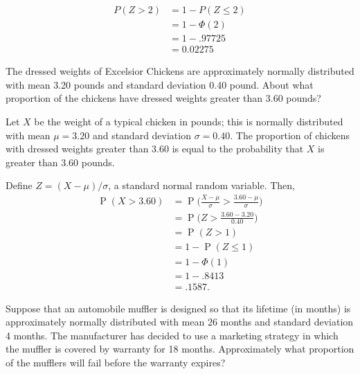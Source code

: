 \documentclass[answers,11pt]{exam}
\DeclareMathOperator*{\Prob}{P}
\renewcommand{\Pr}{\Prob}
\begin{document}
\begin{questions}
\begin{solution}
\begin{align*}
  P(Z > 2) &= 1 - P(Z \leq 2) \\
  	      &= 1 - \Phi(2) \\
	      &= 1 - .97725 \\
	      &= 0.02275
\end{align*}
\end{solution}



\newpage



\question The dressed weights of Excelsior Chickens are approximately normally
distributed with mean 3.20 pounds and standard deviation 0.40 pound.  About
what proportion of the chickens have dressed weights greater than 3.60 pounds?

\begin{solution}
Let $X$ be the weight of a typical chicken in pounds; this is normally distributed with
mean $\mu = 3.20$ and standard deviation $\sigma = 0.40$.  The proportion of
chickens with dressed weights greater than 3.60 is equal to the probability
that $X$ is greater than 3.60 pounds.

Define
$Z = (X - \mu)/\sigma$, a standard normal random variable.  Then,
\begin{align*}
  \Pr(X > 3.60)
    &= \Pr\Big(\frac{X - \mu}{\sigma} > \frac{3.60 - \mu}{\sigma}\Big) \\
    &= \Pr\Big(Z > \frac{3.60 - 3.20}{0.40}\Big) \\
    &= \Pr(Z > 1) \\
    &= 1 - \Pr(Z \leq 1) \\
    &= 1 - \Phi(1) \\
    &= 1 - .8413 \\
    &= .1587.
\end{align*}
\end{solution}




\ifprintanswers\newpage\fi

\question Suppose that an automobile muffler is designed so that its lifetime (in
months) is approximately normally distributed with mean 26 months and standard
deviation 4 months.  The manufacturer has decided to use a marketing strategy
in which the muffler is covered by warranty for 18 months.  Approximately what
proportion of the mufflers will fail before the warranty expires?


\end{questions}
\end{document}
